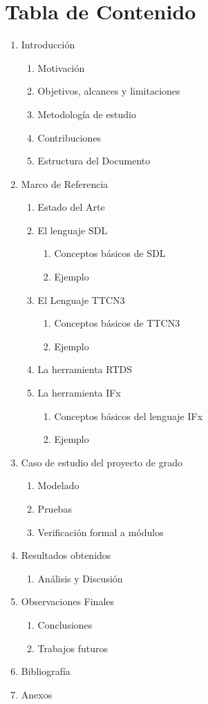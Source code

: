 \section{Tabla de Contenido}

\begin{enumerate}
	\item Introducci\'on
	\begin{enumerate}[{1}.1.]
		\item Motivaci\'on
		\item Objetivos, alcances y limitaciones
		\item Metodolog\'ia de estudio
		\item Contribuciones  
		\item Estructura del Documento
	\end{enumerate}
	\item Marco de Referencia
	\begin{enumerate}[{2}.1.]
		\item Estado del Arte
		\item El lenguaje SDL
		\begin{enumerate}[{2}.2.1.]
		      \item Conceptos b\'asicos de SDL 
		      \item Ejemplo
		\end{enumerate}
		\item El Lenguaje TTCN3
		\begin{enumerate}[{2}.3.1.]
		      \item Conceptos b\'asicos de TTCN3 
		      \item Ejemplo
		\end{enumerate}
		\item La herramienta RTDS
		\item La herramienta IFx
		\begin{enumerate}[{2}.5.1.]
		      \item Conceptos b\'asicos del lenguaje IFx  
		      \item Ejemplo
		\end{enumerate}
	\end{enumerate}
	\item Caso de estudio del proyecto de grado
	\begin{enumerate}[{3}.1.]
		\item Modelado 
		\item Pruebas 
		\item Verificaci\'on formal a m\'odulos 
	\end{enumerate}
	\item Resultados obtenidos
	\begin{enumerate}[{4}.1.]
		\item An\'alisis y Discusi\'on
	\end{enumerate}
	\item Observaciones Finales
	\begin{enumerate}[{5}.1.]
		\item Conclusiones
		\item Trabajos futuros
	\end{enumerate}
	\item Bibliograf\'ia
	\item Anexos
\end{enumerate}

